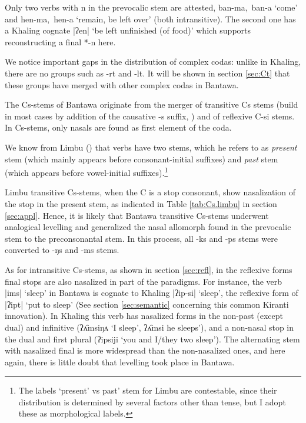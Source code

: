 \documentclass[oneside,a4paper,11pt]{article}
\newcommand{\ipa}[1]{{\phon\mbox{#1}}} %
\newcommand{\dhatu}[2]{|\ipa{#1}| `#2'}
\begin{document}
Only two verbs with \ipa{n} in the prevocalic stem are attested, \ipa{ban-ma, ban-a} `come' and \ipa{hen-ma, hen-a} `remain, be left over' (both intransitive). The second one has a Khaling cognate \dhatu{ʔen}{be left unfinished (of food)} which supports reconstructing a final \ipa{*-n} here.

We notice important gaps in the distribution of complex codas: unlike in Khaling, there are no groups such as \ipa{-rt} and \ipa{-lt}. It will be shown in section \ref{sec:Ct} that these groups have merged with other complex codas in Bantawa.

The Cs-stems of Bantawa originate from the merger of transitive Cs stems (build in most cases by addition of the causative \ipa{-s} suffix, \citealt{michailovsky85dental}) and of reflexive C-si stems. In Cs-stems, only nasals are found as first element of the coda. 

We know from Limbu (\citealt[xiii]{michailovsky02dico}) that verbs have two stems, which he refers to as \textit{present} stem (which mainly appears before consonant-initial suffixes) and \textit{past} stem (which appears before vowel-initial suffixes).\footnote{The labels `present' vs  past' stem for Limbu are contestable, since their distribution is determined by several factors other than tense, but I adopt these as morphological labels.}

Limbu transitive Cs-stems, when the C is a stop consonant, show nasalization of the stop in the present stem, as indicated in Table \ref{tab:Cs.limbu} in section \ref{sec:appl}. Hence, it is likely that Bantawa transitive Cs-stems underwent analogical levelling and generalized the nasal allomorph found in the prevocalic stem to the preconsonantal stem.  In this process, all \ipa{-ks} and \ipa{-ps} stems were converted to \ipa{-ŋs} and \ipa{-ms} stems.

As for intransitive Cs-stems, as shown in section \ref{sec:refl}, in the reflexive forms final stops are also nasalized in part of the paradigms. For instance, the verb \dhatu{ims}{sleep} in Bantawa is cognate to Khaling \dhatu{ʔip-si}{sleep}, the reflexive form of \dhatu{ʔipt}{put to sleep} (See section \ref{sec:semantic} concerning this common Kiranti innovation). In Khaling this verb has nasalized forms in the non-past (except dual) and infinitive (\ipa{ʔʌ̂msiŋʌ} `I sleep', \ipa{ʔʌ̂msi} he sleeps'), and a non-nasal stop in the dual and first plural (\ipa{ʔipsiji} `you and I/they two sleep'). The alternating stem with nasalized final is more widespread than the non-nasalized ones, and here again, there is little doubt that levelling took place in Bantawa.
\end{document}
